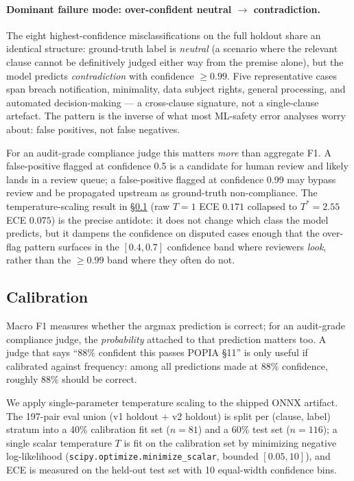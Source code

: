 \documentclass[11pt]{article}
\begin{document}
\paragraph{Dominant failure mode: over-confident neutral $\to$ contradiction.} The eight highest-confidence misclassifications on the full holdout share an identical structure: ground-truth label is \emph{neutral} (a scenario where the relevant clause cannot be definitively judged either way from the premise alone), but the model predicts \emph{contradiction} with confidence $\ge 0.99$. Five representative cases span breach notification, minimality, data subject rights, general processing, and automated decision-making --- a cross-clause signature, not a single-clause artefact. The pattern is the inverse of what most ML-safety error analyses worry about: false positives, not false negatives.

For an audit-grade compliance judge this matters \emph{more} than aggregate F1. A false-positive flagged at confidence 0.5 is a candidate for human review and likely lands in a review queue; a false-positive flagged at confidence 0.99 may bypass review and be propagated upstream as ground-truth non-compliance. The temperature-scaling result in \S\ref{sec:calibration} (raw $T=1$ ECE $0.171$ collapsed to $T^\ast = 2.55$ ECE $0.075$) is the precise antidote: it does not change which class the model predicts, but it dampens the confidence on disputed cases enough that the over-flag pattern surfaces in the $[0.4, 0.7]$ confidence band where reviewers \emph{look}, rather than the $\ge 0.99$ band where they often do not.

\subsection{Calibration}
\label{sec:calibration}

Macro F1 measures whether the argmax prediction is correct; for an audit-grade compliance judge, the \emph{probability} attached to that prediction matters too. A judge that says ``88\% confident this passes POPIA \S 11'' is only useful if calibrated against frequency: among all predictions made at 88\% confidence, roughly 88\% should be correct.

We apply single-parameter temperature scaling \cite{guo2017calibration} to the shipped ONNX artifact. The 197-pair eval union (v1 holdout + v2 holdout) is split per (clause, label) stratum into a 40\% calibration fit set ($n=81$) and a 60\% test set ($n=116$); a single scalar temperature $T$ is fit on the calibration set by minimizing negative log-likelihood (\texttt{scipy.optimize.minimize\_scalar}, bounded $[0.05, 10]$), and ECE is measured on the held-out test set with 10 equal-width confidence bins.
\end{document}
